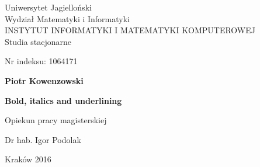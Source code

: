 \begin{titlepage}
\begin{center}
Uniwersytet Jagielloński \\
Wydział Matematyki i Informatyki \\
{\large INSTYTUT INFORMATYKI I MATEMATYKI KOMPUTEROWEJ} \\
Studia stacjonarne \\
\end{center}

\vspace*{\fill}

Nr indeksu: 1064171

\vspace*{\fill}

\begin{center}
	{\Large\textbf{Piotr Kowenzowski}}

\vspace*{0.5cm}
{\Huge\textbf {Bold, italics and underlining}}

\end{center}



\vspace*{\fill}

\begin{flushright}
Opiekun pracy magisterskiej

Dr hab. Igor Podolak
\end{flushright}

\vspace*{\fill}

\begin{center}
	{\huge Kraków 2016}
\end{center}
\end{titlepage}
